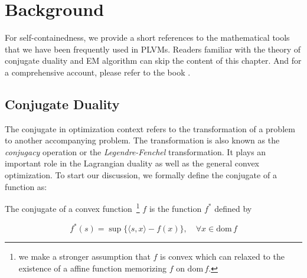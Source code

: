 \chapter{Background} \label{chp::bg}

For self-containedness, we provide a short references to the mathematical tools
that we have been frequently used in PLVMs. Readers familiar with the theory of
conjugate duality and EM algorithm can skip the content of this chapter. And for
a comprehensive account, please refer to the book \cite{hiriart1993convex}.

\section{Conjugate Duality}

The conjugate in optimization context refers to the transformation of a problem
to another accompanying problem. The transformation is also known as the
\emph{conjugacy} operation or the \emph{Legendre-Fenchel} transformation.  It
plays an important role in the Lagrangian duality as well as the general convex
optimization. To start our discussion, we formally define the conjugate of a
function as:

\begin{dfn}

  The conjugate of a convex function~\footnote{we make a stronger assumption
  that $f$ is convex which can relaxed to the existence of a affine function
  memorizing $f$ on $\mathrm{dom}\, f$.} $f$ is the function $f^*$ defined by

  \begin{equation}
    f^*(s) = \sup \{ \langle s, x \rangle - f(x) \}, \quad
    \forall x \in \mathrm{dom}\, f
  \end{equation}

\end{dfn}


